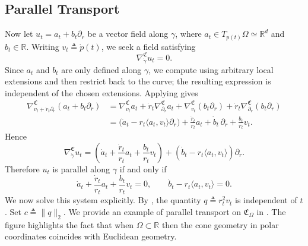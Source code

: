 \documentclass[11pt]{article}
\begin{document}
\subsection{Parallel Transport}

Now let $u_t = a_t + b_t\partial_r$ be a vector field along $\gamma$, where
$a_t \in T_{p(t)}\Omega \simeq \mathbb{R}^d$ and $b_t \in \mathbb{R}$. Writing
$v_t \triangleq \dot p(t)$, we seek a field satisfying
\[
\nabla^\mathfrak{C}_{\dot \gamma}u_t = 0.
\]
Since $a_t$ and $b_t$ are only defined along $\gamma$, we compute using arbitrary local extensions and then restrict back to the curve; the resulting expression is independent of the chosen extensions. Applying  gives
\begin{align*}
    \nabla^\mathfrak{C}_{v_t + \dot r_t\partial_r}(a_t + b_t\partial_r)
    &= \nabla^\mathfrak{C}_{v_t}a_t
       + \dot r_t\nabla^\mathfrak{C}_{\partial_r}a_t
       + \nabla^\mathfrak{C}_{v_t}(b_t\partial_r)
       + \dot r_t\nabla^\mathfrak{C}_{\partial_r}(b_t\partial_r) \\
    &= \Big(\dot a_t - r_t\langle a_t, v_t\rangle \partial_r\Big)
       + \frac{\dot r_t}{r_t}a_t
       + \dot b_t\,\partial_r
       + \frac{b_t}{r_t}v_t.
\end{align*}
Hence
\[
\nabla^\mathfrak{C}_{\dot \gamma}u_t
=
\left(\dot a_t + \frac{\dot r_t}{r_t}a_t + \frac{b_t}{r_t}v_t\right)
+
\left(\dot b_t - r_t\langle a_t, v_t\rangle\right)\partial_r.
\]
Therefore $u_t$ is parallel along $\gamma$ if and only if
\begin{equation}\label{eq: cone PT system}
    \dot a_t + \frac{\dot r_t}{r_t}a_t + \frac{b_t}{r_t}v_t = 0,
    \qquad
    \dot b_t - r_t\langle a_t, v_t\rangle = 0.
\end{equation}
We now solve this system explicitly. By , the quantity $q \triangleq r_t^2 v_t$ is independent of $t$. Set $c \triangleq \|q\|_2$. We provide an example of parallel transport on $\mathfrak{C}_\Omega$ in . The figure highlights the fact that when $\Omega \subset \mathbb{R}$ then the cone geometry in polar coordinates coincides with Euclidean geometry. 
\end{document}
